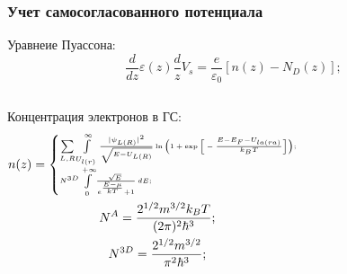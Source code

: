 \documentclass[10pt,pdf,hyperref={unicode},aspectratio={169}]{beamer}
\begin{document}
\begin{frame}
	\frametitle{Учет самосогласованного потенциала}
	{\color{blue}Уравнеие Пуассона:}
	\begin{equation*}
		\frac{d}{dz}\varepsilon(z)\frac{d}{z}V_{s} = \frac{e}{\varepsilon_{0}}[n(z) - N_{D}(z)];
	\end{equation*}

\begin{columns}
	{\color{red}Концентрация электронов в ГС:}
	\footnotesize
	\begin{gather*}
		{\tiny n(z) = \begin{cases}
					\sum\limits_{L,R}\int\limits_{U_{l(r)}}^{\infty} \frac{|\psi_{L(R)}|^{2}}{\sqrt{E - U_{L(R)}}} \ln \bigg( 1 + \exp\bigg[ -\frac{E - E_{F} - U_{la(ra)}}{k_{B}T} \bigg] \bigg);\\
					N^{3D} \int\limits_{0}^{+\infty}\! \frac{\sqrt[]{E}}{e^{\frac{E-\mu}{kT}}+1} \,dE;
				\end{cases}}\\
		N^{A} = \frac{2^{1/2}m^{3/2}k_{B}T}{(2\pi)^{2}\hbar^{3}};\\
		N^{3D} = \frac{2^{1/2}m^{3/2}}{\pi^{2}\hbar^{3}}; 
	\end{gather*}
\end{columns}
\end{frame}
\end{document}
